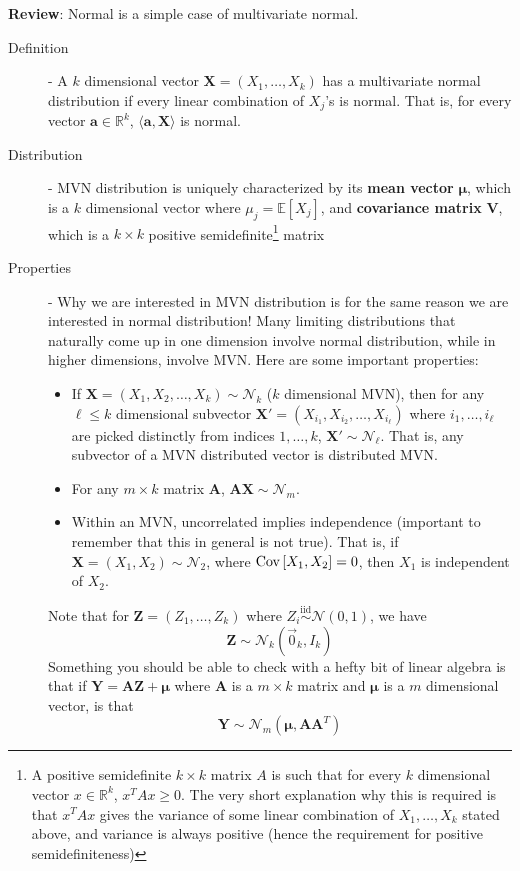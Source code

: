 \documentclass[11pt]{article}
\theoremstyle{definition}
\theoremstyle{remark}
\newcommand{\R}{\mathbb{R}}
\newcommand{\E}[1]{\mathbb{E}\left[ #1 \right]}
\newcommand{\cov}[2]{\textnormal{Cov}\left[ #1, #2 \right]}
\newcommand{\Norm}{\mathcal{N}}
\begin{document}
\textbf{Review}: Normal is a simple case of multivariate normal. 
\begin{description}
    \item[Definition] - A $k$ dimensional vector $\bm{X} = (X_1, \ldots, X_k)$ has a multivariate normal distribution if every linear combination of $X_j$'s is normal. That is, for every vector $\bm{a} \in \R^k$, $\langle \bm{a} , \bm{X} \rangle$ is normal.
    \item[Distribution] - MVN distribution is uniquely characterized by its \textbf{mean vector} $\bm{\mu}$, which is a $k$ dimensional vector where $\mu_j = \E{X_j}$, and \textbf{covariance matrix} $\bm{V}$, which is a $k \times k$ positive semidefinite\footnote{A positive semidefinite $k \times k$ matrix $A$ is such that for every $k$ dimensional vector $x \in \R^k$, $x^T A x \geq 0$. The very short explanation why this is required is that $x^T A x$ gives the variance of some linear combination of $X_1, \ldots, X_k$ stated above, and variance is always positive (hence the requirement for positive semidefiniteness)} matrix 
    \item[Properties] - Why we are interested in MVN distribution is for the same reason we are interested in normal distribution! Many limiting distributions that naturally come up in one dimension involve normal distribution, while in higher dimensions, involve MVN. Here are some important properties:
    \begin{itemize}
        \item If $\bm{X} = (X_1, X_2, \ldots, X_k) \sim \Norm_k$ ($k$ dimensional MVN), then for any $\ell \leq k$ dimensional subvector $\bm{X}' = (X_{i_1}, X_{i_2}, \ldots, X_{i_{\ell}})$ where $i_1, \ldots, i_{\ell}$ are picked distinctly from indices $1, \ldots, k$, $\bm{X}' \sim \Norm_{\ell}$. That is, any subvector of a MVN distributed vector is distributed MVN. 
        \item For any $m \times k$ matrix $\bm{A}$, $\bm{A} \bm{X} \sim \Norm_m$.
        \item Within an MVN, uncorrelated implies independence (important to remember that this in general is not true). That is, if $\bm{X} = (X_1, X_2) \sim \Norm_2$, where $\cov{X_1}{X_2} = 0$, then $X_1$ is independent of $X_2$. 
    \end{itemize}
    
    Note that for $\bm{Z} = (Z_1, \ldots, Z_k)$ where $Z_i \overset{\text{iid}}{\sim} \Norm(0,1)$, we have $$\bm{Z} \sim \Norm_k(\vec{0}_k, I_k)$$ Something you should be able to check with a hefty bit of linear algebra is that if $\bm{Y} = \bm{A} \bm{Z} + \bm{\mu}$ where $\bm{A}$ is a $m \times k$ matrix and $\bm{\mu}$ is a $m$ dimensional vector, is that $$ \bm{Y} \sim \Norm_m (\bm{\mu}, \bm{A} \bm{A}^T)$$
\end{description}
\end{document}
